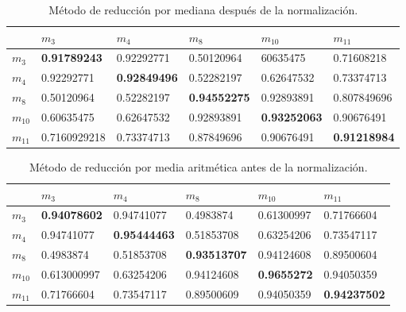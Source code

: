 \hfill

\begin{table}[ht!]
\begin{center}
\begin{tabular}{| p{2cm} | p{2cm} | p{2cm} | p{2cm} | p{2cm} | p{2cm} |}
\hline
 & $m_{3}$ & $m_{4}$ & $m_{8}$ & $m_{10}$ & $m_{11}$ \\
\hline
$m_{3}$ & \bf{0.91789243} & 0.92292771 & 0.50120964 & 60635475 & 0.71608218\\
\hline
$m_{4}$ & 0.92292771 & \bf{0.92849496} & 0.52282197 & 0.62647532 & 0.73374713\\
\hline
$m_{8}$ & 0.50120964 & 0.52282197 & \bf{0.94552275} & 0.92893891 & 0.807849696\\
\hline 
$m_{10}$ & 0.60635475 & 0.62647532 & 0.92893891 & \bf{0.93252063} & 0.90676491\\
\hline
$m_{11}$ & 0.7160929218 & 0.73374713 & 0.87849696 & 0.90676491 & \bf{0.91218984}\\
\hline
\end{tabular}
\end{center} 	
\caption{Método de reducción por mediana después de la normalización.} \label{covmednorm1}
\end{table}


\hfill

\begin{table}[ht!]
\begin{center}
\begin{tabular}{| p{2cm} | p{2cm} | p{2cm} | p{2cm} | p{2cm} | p{2cm} |}
\hline
 & $m_{3}$ & $m_{4}$ & $m_{8}$ & $m_{10}$ & $m_{11}$ \\
\hline
$m_{3}$ & \bf{0.94078602} & 0.94741077 & 0.4983874 & 0.61300997 & 0.71766604\\
\hline
$m_{4}$ & 0.94741077 & \bf{0.95444463} & 0.51853708 & 0.63254206 & 0.73547117\\
\hline
$m_{8}$ & 0.4983874 & 0.51853708 & \bf{0.93513707} & 0.94124608 & 0.89500604\\
\hline 
$m_{10}$ & 0.613000997 & 0.63254206 & 0.94124608 & \bf{0.9655272} & 0.94050359\\
\hline
$m_{11}$ & 0.71766604 & 0.73547117 & 0.89500609 & 0.94050359 & \bf{0.94237502}\\
\hline
\end{tabular}
\end{center} 	
\caption{Método de reducción por media aritmética antes de la normalización.} \label{covprom1} 
\end{table}


